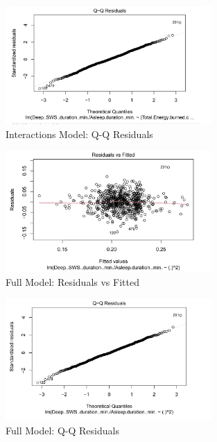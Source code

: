 \documentclass{article}
\begin{document}
\begin{figure}[h!]
  \centering
  \includegraphics[width=0.7\textwidth]{images/model_rr_plot2.png}
  \caption{Interactions Model: Q-Q Residuals}
  \label{fig:I=interactions_qq_residuals}
\end{figure}

\begin{figure}[h!]
  \centering
  \includegraphics[width=0.7\textwidth]{images/model_full_plot1.png}
  \caption{Full Model: Residuals vs Fitted}
  \label{fig:full_residuals_vs_fitted}
\end{figure}
\begin{figure}[h!]
  \centering
  \includegraphics[width=0.7\textwidth]{images/model_full_plot2.png}
  \caption{Full Model: Q-Q Residuals}
  \label{fig:full_qq_residuals}
\end{figure}
\end{document}
